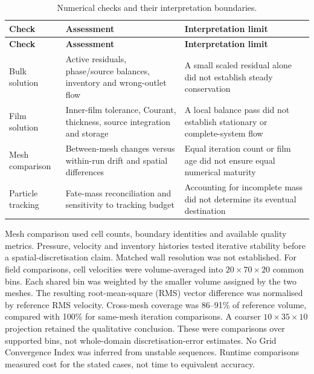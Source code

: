 \begin{longtable}{@{}>{\raggedright\arraybackslash}p{0.29000000\dimexpr\linewidth-4\tabcolsep\relax}>{\raggedright\arraybackslash}p{0.34000000\dimexpr\linewidth-4\tabcolsep\relax}>{\raggedright\arraybackslash}p{0.37000000\dimexpr\linewidth-4\tabcolsep\relax}@{}}
\caption{Numerical checks and their interpretation boundaries.}\label{tab:table-2}\\
\toprule
\textbf{Check} & \textbf{Assessment} & \textbf{Interpretation limit} \\
\midrule
\endfirsthead
\toprule
\textbf{Check} & \textbf{Assessment} & \textbf{Interpretation limit} \\
\midrule
\endhead
Bulk solution & Active residuals, phase/source balances, inventory and wrong-outlet flow & A small scaled residual alone did not establish steady conservation \\
Film solution & Inner-film tolerance, Courant, thickness, source integration and storage & A local balance pass did not establish stationary or complete-system flow \\
Mesh comparison & Between-mesh changes versus within-run drift and spatial differences & Equal iteration count or film age did not ensure equal numerical maturity \\
Particle tracking & Fate-mass reconciliation and sensitivity to tracking budget & Accounting for incomplete mass did not determine its eventual destination \\
\bottomrule
\end{longtable}

Mesh comparison used cell counts, boundary identities and available quality metrics. Pressure, velocity and inventory histories tested iterative stability before a spatial-discretisation claim. Matched wall resolution was not established. For field comparisons, cell velocities were volume-averaged into \(20\times70\times20\) common bins. Each shared bin was weighted by the smaller volume assigned by the two meshes. The resulting root-mean-square (RMS) vector difference was normalised by reference RMS velocity. Cross-mesh coverage was 86--91\% of reference volume, compared with 100\% for same-mesh iteration comparisons. A coarser \(10\times35\times10\) projection retained the qualitative conclusion. These were comparisons over supported bins, not whole-domain discretisation-error estimates. No Grid Convergence Index was inferred from unstable sequences. Runtime comparisons measured cost for the stated cases, not time to equivalent accuracy.

